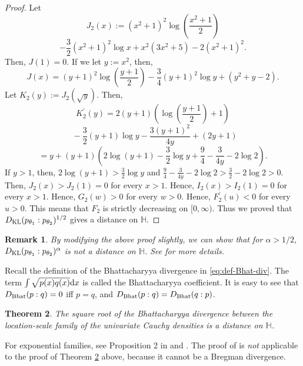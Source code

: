\documentclass[journal]{IEEEtran}
\newtheorem{theorem}{Theorem}
\newtheorem{remark}[theorem]{Remark}
\begin{document}
\begin{proof}
Let 
$$  J_2 (x) :=  (x^2 +1)^2 \log \left(\frac{x^2 +1}{2} \right) $$
$$- \frac{3}{2} (x^2 +1)^2 \log x + x^2 (3x^2 + 5) - 2(x^2 +1)^2.   $$
Then, $J(1) = 0$. 
If we let $y := x^2$, then, 
$$ J(x) = (y +1)^2 \log \left(\frac{y +1}{2} \right) - \frac{3}{4} (y +1)^2 \log y +(y^2 + y -2).    $$
Let $K_2 (y) := J_2 (\sqrt{y})$. 
Then, 
\[ K_2^{\prime}(y) =  2(y +1) \left(\log \left(\frac{y +1}{2} \right) +1\right)\]
\[ \ \ - \frac{3}{2} (y +1) \log y - \frac{3(y +1)^2}{4y}  +(2y+1) \]
 \[ = y + (y+1)\left(2 \log \left(y +1 \right) - \frac{3}{2} \log y + \frac{9}{4} - \frac{3}{4y} - 2\log 2\right). 
\]
If $y > 1$, then, 
$ 2 \log \left(y +1 \right) > \frac{3}{2} \log y$
and 
$ \frac{9}{4} - \frac{3}{4y} - 2\log 2 > \frac{3}{2} - 2\log 2 > 0.$
Then, $J_2 (x) > J_2 (1) = 0$ for every $x > 1$. 
Hence, $I_2 (x) > I_2 (1) = 0$ for every $x > 1$. 
Hence, $G_2 (w) > 0$ for every $w > 0$. 
Hence, $F_2^{\prime}(u) < 0$ for every $u > 0$. 
This means that $F_2$ is strictly decreasing on $[0, \infty)$.
Thus we proved that $D_{\mathrm{KL}}(p_{\theta_1} : p_{\theta_2})^{1/2}$ gives a distance on $\mathbb H$.  
\end{proof}

\begin{remark}\label{rmk:extension}
By modifying the above proof slightly, we can show that for $\alpha > 1/2$, $D_{\mathrm{KL}}(p_{\theta_1} : p_{\theta_2})^{\alpha}$ is not a distance on $\mathbb H$. 
See \cite{Nielsen2021f} for more details. 
\end{remark}



Recall the definition of the Bhattacharyya divergence in \eqref{eq:def-Bhat-div}. 
The term $\int \sqrt{p(x)q(x)} \mathrm{d}x$ is called the Bhattacharyya coefficient.
It is easy to see that $D_{\mathrm{Bhat}}(p:q) = 0$ iff $p=q$, and $D_{\mathrm{Bhat}}(p:q) =D_{\mathrm{Bhat}}(q:p)$. 

\begin{theorem}\label{thm:sqrtBhat}
The square root of the Bhattacharyya divergence between the location-scale family of the univariate Cauchy densities is a distance on $\mathbb H$. 
\end{theorem}

For exponential families, see Proposition 2 in \cite{CauchyVoronoi-2020} and \cite{nielsen2011burbea}. 
The proof of \cite[Proposition 2]{CauchyVoronoi-2020} is {\it not} applicable to the proof of Theorem \ref{thm:sqrtBhat} above, 
because it cannot be a Bregman divergence. 
\end{document}
